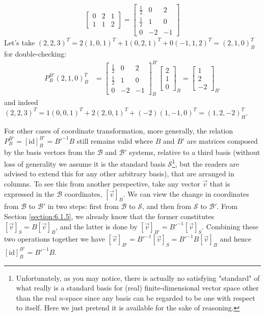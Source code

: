 \begin{solution}
\begin{align*}
\begin{bmatrix}
0 & 2 & 1 \\
1 & 1 & 2
\end{bmatrix}
=
\begin{bmatrix}
\frac{1}{2} & 0 & 2 \\
\frac{1}{2} & 1 & 0 \\
0 & -2 & -1
\end{bmatrix}
\end{align*}
Let's take $(2,2,3)^T = 2(1,0,1)^T + 1(0,2,1)^T + 0(-1,1,2)^T = (2,1,0)^T_B$ for double-checking:
\begin{align*}
P_B^{B'}(2,1,0)^T_B &= 
\begin{bmatrix}
\frac{1}{2} & 0 & 2 \\
\frac{1}{2} & 1 & 0 \\
0 & -2 & -1
\end{bmatrix}_B^{B'}
\begin{bmatrix}
2 \\
1 \\
0
\end{bmatrix}_B
=
\begin{bmatrix}
1 \\
2 \\
-2
\end{bmatrix}_{B'}
\end{align*}
and indeed $(2,2,3)^T = 1(0,0,1)^T + 2(2,0,1)^T + (-2)(1,-1,0)^T = (1,2,-2)^T_H$.
\end{solution}
For other cases of coordinate transformation, more generally, the relation $P_B^{B'} = [\text{id}]_B^{B'} = B'^{-1}B$ still remains valid where $B$ and $B'$ are matrices composed by the basis vectors from the $\mathcal{B}$ and $\mathcal{B}'$ systems, relative to a third basis (without loss of generality we assume it is the standard basis $\mathcal{S}$\footnote{Unfortunately, as you may notice, there is actually no satisfying "standard" of what really is a standard basis for (real) finite-dimensional vector space other than the real $n$-space since any basis can be regarded to be one with respect to itself. Here we just pretend it is available for the sake of reasoning.}, but the readers are advised to extend this for any other arbitrary basis), that are arranged in columns. To see this from another perspective, take any vector $\vec{v}$ that is expressed in the $\mathcal{B}$ coordinates, $[\vec{v}]_B$. We can view the change in coordinates from $\mathcal{B}$ to $\mathcal{B}'$ in two steps: first from $\mathcal{B}$ to $\mathcal{S}$, and then from $\mathcal{S}$ to $\mathcal{B}'$. From Section \ref{section:6.1.5}, we already know that the former constitutes $[\vec{v}]_S = B[\vec{v}]_B$, and the latter is done by $[\vec{v}]_{B'} = B'^{-1}[\vec{v}]_S$. Combining these two operations together we have $[\vec{v}]_{B'} = B'^{-1}[\vec{v}]_S = B'^{-1}B[\vec{v}]_B$ and hence $[\text{id}]_B^{B'} = B'^{-1}B$.


